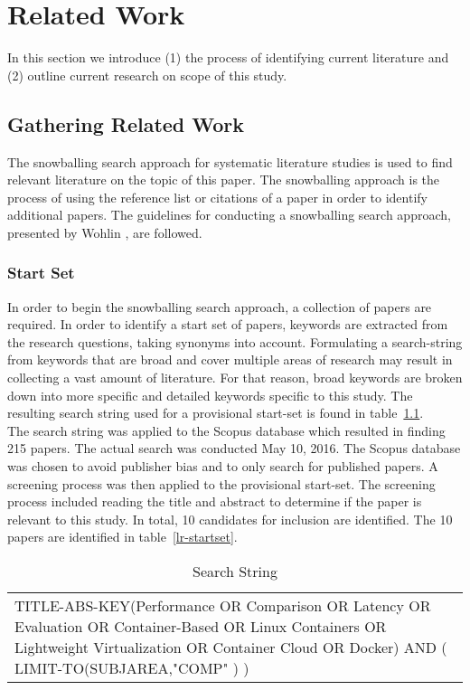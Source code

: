 \iffalse  \fi
\chapter{Related Work}
In this section we introduce (1) the process of identifying current literature and (2) outline current research on scope of this study.

\section{Gathering Related Work}
The snowballing search approach for systematic literature studies is used to find relevant literature on the topic of this paper. The snowballing approach is the process of using the reference list or citations of a paper in order to identify additional papers. The guidelines for conducting a snowballing search approach, presented by Wohlin \cite{Wohlin}, are followed. 

\subsection{Start Set}
In order to begin the snowballing search approach, a collection of papers are required. In order to identify a start set of papers, keywords are extracted from the research questions, taking synonyms into account. Formulating a search-string from keywords that are broad and cover multiple areas of research may result in collecting a vast amount of literature. For that reason, broad keywords are broken down into more specific and detailed keywords specific to this study. The resulting search string used for a provisional start-set is found in table~\ref{search-string}. \\


The search string was applied to the Scopus \cite{scopus} database which resulted in finding 215 papers. The actual search was conducted May 10, 2016. The Scopus database was chosen to avoid publisher bias and to only search for published papers. A screening process was then applied to the provisional start-set. The screening process included reading the title and abstract to determine if the paper is relevant to this study. In total, 10 candidates for inclusion are identified. The 10 papers are identified in table~\ref{lr-startset}.

\begin{table}[h]
\centering
\begin{tabular}{p{15cm}}
TITLE-ABS-KEY(Performance OR Comparison OR Latency OR Evaluation OR Container-Based OR Linux Containers OR Lightweight Virtualization OR Container Cloud OR Docker) AND ( LIMIT-TO(SUBJAREA,"COMP" ) )
\end{tabular}
\caption{Search String}
\label{search-string}
\end{table}

